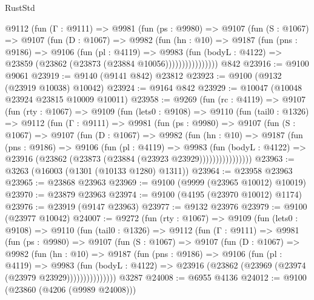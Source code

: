 \begin{lexlean}{RustStd}
\begin{coremodule}
            @9112
              (fun (Γ : @9111) =>
              @9981
                (fun (ps : @9980) =>
                @9107
                  (fun (S : @1067) =>
                  @9107
                    (fun (D : @1067) =>
                    @9982
                      (fun (hn : @10) =>
                      @9187
                        (fun (pns : @9186) =>
                        @9106
                          (fun (pl : @4119) =>
                          @9983
                            (fun (bodyL : @4122) =>
                            @23859 (@23862 (@23873 (@23884 @10056))))))))))))))))
    @842
@23916 := @9100 @9061
@23919 := @9140 (@9141 @842) @23812
@23923 := @9100 (@9132 (@23919 @10038) @10042)
@23924 := @9164 @842
@23929 := @10047 (@10048 @23924 @23815 @10009 @10011)
@23958 := @9269
    (fun (rc : @4119) =>
    @9107
      (fun (rty : @1067) =>
      @9109
        (fun (lets0 : @9108) =>
        @9110
          (fun (tail0 : @1326) =>
          @9112
            (fun (Γ : @9111) =>
            @9981
              (fun (ps : @9980) =>
              @9107
                (fun (S : @1067) =>
                @9107
                  (fun (D : @1067) =>
                  @9982
                    (fun (hn : @10) =>
                    @9187
                      (fun (pns : @9186) =>
                      @9106
                        (fun (pl : @4119) =>
                        @9983
                          (fun (bodyL : @4122) =>
                          @23916 (@23862 (@23873 (@23884 (@23923 @23929))))))))))))))))
@23963 := @3263 (@16003 (@1301 (@10133 @1280) @1311))
@23964 := @23958 @23963
@23965 := @23868 @23963
@23969 := @9100 (@9999 (@23965 @10012) @10019)
@23970 := @23879 @23963
@23974 := @9100 (@4195 (@23970 @10012) @1174)
@23976 := @23919 (@9147 @23963)
@23977 := @9132 @23976
@23979 := @9100 (@23977 @10042)
@24007 := @9272
    (fun (rty : @1067) =>
    @9109
      (fun (lets0 : @9108) =>
      @9110
        (fun (tail0 : @1326) =>
        @9112
          (fun (Γ : @9111) =>
          @9981
            (fun (ps : @9980) =>
            @9107
              (fun (S : @1067) =>
              @9107
                (fun (D : @1067) =>
                @9982
                  (fun (hn : @10) =>
                  @9187
                    (fun (pns : @9186) =>
                    @9106
                      (fun (pl : @4119) =>
                      @9983
                        (fun (bodyL : @4122) =>
                        @23916 (@23862 (@23969 (@23974 (@23979 @23929)))))))))))))))
    @3287
@24008 := @6955 @4136
@24012 := @9100 (@23860 (@4206 (@9989 @24008)))

\end{coremodule}
\end{lexlean}

